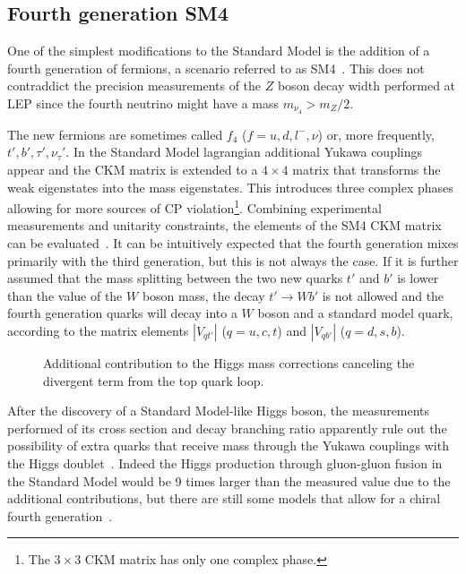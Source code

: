 \subsection{Fourth generation SM4}\label{sec:sm4}

One of the simplest modifications to the Standard Model
is the addition of a fourth generation of fermions, a
scenario referred to as SM4~\cite{Holdom:2009rf}. 
This does not contraddict the precision measurements of the $Z$
boson decay width performed at LEP since the fourth neutrino
might have a mass $m_{\nu_4}>m_{Z}/2$.

The new fermions are sometimes called $f_4$ ($f=u,d,l^{-},\nu$)
or, more frequently, $t', b', \tau', \nu_{\tau}'$. In the
Standard Model lagrangian additional Yukawa couplings appear
and the CKM matrix is extended to a $4\times 4$ matrix that
transforms the weak eigenstates into the mass eigenstates.
This introduces three complex phases allowing for more
sources of CP violation\footnote{The $3\times 3$ CKM
matrix has only one complex phase.}. Combining experimental
measurements and unitarity constraints, the elements of
the SM4 CKM matrix can be evaluated~\cite{Lacker}. It
can be intuitively expected that the fourth generation mixes
primarily with the third generation, but this is not always 
the case. If it is further
assumed that the mass splitting between the two new quarks
$t'$ and $b'$ is lower than the value of the $W$ boson mass,
the decay $t'\to Wb'$ is not allowed and the fourth generation
quarks will decay into a $W$ boson and a standard model quark,
according to the matrix elements $|V_{qt'}|$ ($q=u,c,t$) 
and $|V_{qb'}|$ ($q=d,s,b$).


\begin{figure}[htb]\begin{center}
\caption{Additional contribution to the Higgs mass
corrections canceling the divergent term from the
top quark loop.\label{fig:susyloops}}
\end{center}\end{figure}

After the discovery of a Standard Model-like Higgs boson,
the measurements performed of its cross section and decay 
branching ratio apparently rule out the possibility
of extra quarks that receive mass through the Yukawa couplings
with the Higgs doublet~\cite{Djouadi:2012ae}.
Indeed the Higgs production through gluon-gluon fusion
in the Standard Model would be 9 times larger than
the measured value due to the additional contributions,
but there are still some models that allow 
for a chiral fourth generation~\cite{Cetin:2011aa}.


